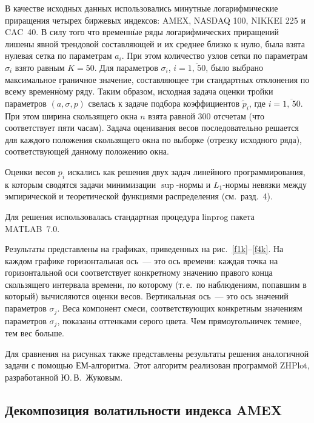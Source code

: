 \begin{multicols}{2}
В качестве исходных данных использовались минутные логарифмические
приращения четырех биржевых индексов: AMEX, NASDAQ 100, NIKKEI 225
и CAC~40. В силу того что временн$\acute{\mbox{ы}}$е ряды логарифмических
приращений лишены явной трендовой составляющей и их среднее близко
к нулю, была взята нулевая сетка по параметрам $a_{i}$. При этом
количество узлов сетки по параметрам $\sigma_{i}$ взято равным
$K=50$. Для параметров $\sigma_{i}$, $i=\overline{1,\,50}$, было
выбрано максимальное граничное значение, составляющее три
стандартных отклонения по всему временн$\acute{\mbox{о}}$му ряду. Таким образом,
исходная задача оценки тройки параметров $(a,\sigma,p)$ свелась к
задаче подбора коэффициентов $\tilde p_{i}$, где
$i=\overline{1,\,50}$. При этом ширина скользящего окна $n$ взята
равной $300$ отсчетам (что соответствует пяти часам). Задача
оценивания весов последовательно решается для каждого положения
скользящего окна по выборке (отрезку исходного ряда),
соответствующей данному положению окна.

Оценки весов $p_i$ искались как решения двух задач линейного
программирования, к которым сводятся задачи минимизации
$\sup$-нормы и $L_1$-нор\-мы невязки между эмпирической и
теоретической функциями распределения (см.\ разд.~4).

Для решения использовалась стандартная процедура {\sf linprog} пакета
MATLAB~7.0.

Результаты представлены на графиках, приведенных на рис.~\ref{f1k}--\ref{f4k}.
На каждом графике горизонтальная ось~--- это ось времени: каждая
точка на горизонтальной оси соответствует конкретному значению
правого конца скользящего интервала времени, по которому (т.\,е.\
по наблюдениям, попавшим в который) вычисляются оценки весов.
Вертикальная ось~--- это ось значений параметров $\sigma_j$. Веса
компонент смеси, соответствующих конкретным значениям параметров
$\sigma_j$, показаны оттенками серого цвета. Чем прямоугольничек
темнее, тем вес больше.

Для сравнения на рисунках также представлены результаты решения
аналогичной задачи с по\-мощью ЕМ-алгоритма. Этот алгоритм
реализован программой ZHPlot, разработанной Ю.\,В.~Жуковым.

\subsection{Декомпозиция волатильности индекса AMEX}


\end{multicols}

